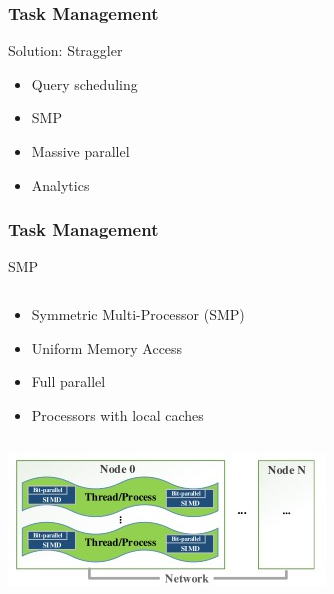 \begin{frame}
\frametitle{Task Management}
\begin{block}{Solution: Straggler}
\begin{itemize}
	\item Query scheduling 
	\item SMP
	\item Massive parallel
	\item Analytics
\end{itemize} 
\end{block}
\end{frame}






\begin{frame}
\frametitle{Task Management}
\begin{block}{SMP}
\begin{column}{.5\textwidth}

\begin{itemize}
	\item Symmetric Multi-Processor (SMP)
	\item Uniform Memory Access
	\item Full parallel
	\item Processors with local caches
\end{itemize} 

\end{column}
\begin{column}{.5\textwidth}
\includegraphics[width=\textwidth]{fig23/smp.jpg}
\end{column}

\end{block}
\end{frame}


